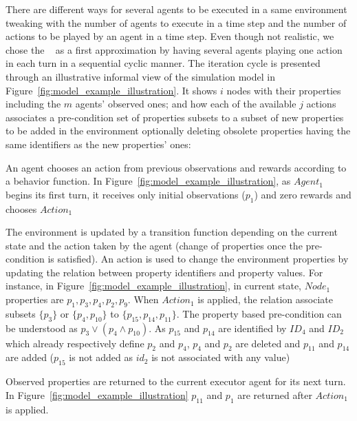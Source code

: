 There are different ways for several agents to be executed in a same environment tweaking with the number of agents to execute in a time step and the number of actions to be played by an agent in a time step. Even though not realistic, we chose the ~\cite{jk2020} as a first approximation by having several agents playing one action in each turn in a sequential cyclic manner. The iteration cycle is presented through an illustrative informal view of the simulation model in Figure~\ref{fig:model_example_illustration}. It shows $i$ nodes with their properties including the $m$ agents' observed ones; and how each of the available $j$ actions associates a pre-condition set of properties subsets to a subset of new properties to be added in the environment optionally deleting obsolete properties having the same identifiers as the new properties' ones: \begin{enumerate*}[label=\arabic*),itemjoin={;\quad}]     
    \item An agent chooses an action from previous observations and rewards according to a behavior function. In Figure~\ref{fig:model_example_illustration}, as $Agent_1$ begins its first turn, it receives only initial observations ($p_{1}$) and zero rewards and chooses $Action_1$
    
    \item The environment is updated by a transition function depending on the current state and the action taken by the agent (change of properties once the pre-condition is satisfied). An action is used to change the environment properties by updating the relation between property identifiers and property values.
    For instance, in Figure~\ref{fig:model_example_illustration}, in current state, $Node_1$ properties are $p_1,p_3,p_4,p_2,p_9$. When $Action_1$ is applied, the relation associate subsets $\{p_3\}$ or $\{p_4, \allowbreak p_{10}\}$ to $\{p_{15}, \allowbreak p_{14}, \allowbreak p_{11}\}$. The property based pre-condition can be understood as $p_3 \lor (p_4 \land p_{10})$. As $p_{15}$ and $p_{14}$ are identified by $ID_4$ and $ID_2$ which already respectively define $p_{2}$ and $p_{4}$, $p_{4}$ and $p_{2}$ are deleted and $p_{11}$ and $p_{14}$ are added ($p_{15}$ is not added as $id_2$ is not associated with any value)
    
    \item Observed properties are returned to the current executor agent for its next turn. In Figure~\ref{fig:model_example_illustration} $p_{11}$ and $p_1$ are returned after $Action_1$ is applied.

\end{enumerate*}

